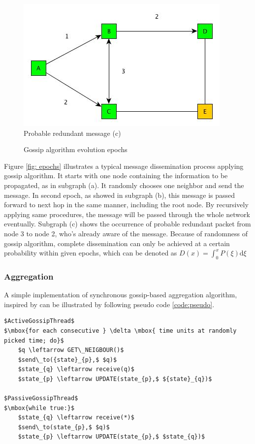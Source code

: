 \begin{figure}[!h]
\begin{center}
\begin{minipage}[c]{0.45\textwidth}
      \vspace{0pt}
      \includegraphics[width=\linewidth]{figures/network_gossip_3.jpg}
      Probable redundant message (c)
   	\end{minipage}
   \end{center}
   \caption{Gossip algorithm evolution epochs}
   \label{fig:epochs}
\end{figure}

Figure \ref{fig: epochs} illustrates a typical message dissemination process applying gossip algorithm. It starts with one node containing the information to be propagated, as in subgraph (a). It randomly chooses one neighbor and send the message. In second epoch, as showed in subgraph (b), this message is passed forward to next hop in the same manner, including the root node. By recursively applying same procedures, the message will be passed through the whole network eventually. Subgraph (c) shows the occurrence of probable redundant packet from node 3 to node 2, who's already aware of the message. Because of randomness of gossip algorithm, complete dissemination can only be achieved at a certain probability within given epochs, which can be denoted as $D(x)=\int_0^x P(\xi)\mathrm{d}\xi$\\

\subsubsection{Aggregation}

A simple implementation of synchronous gossip-based aggregation algorithm, inspired by \cite{jelasity_gossip-based_2005} can be illustrated by following pseudo code \ref{code:pseudo}.
\begin{lstlisting}[caption={Pseudo Code for gossip-based aggregation}, label=code:pseudo, mathescape=true]
$ActiveGossipThread$
$\mbox{for each consecutive } \delta \mbox{ time units at randomly picked time; do}$
    $q \leftarrow GET\_NEIGBOUR()$
    $send\_to({state}_{p},$ $q)$
    $state_{q} \leftarrow receive(q)$
    $state_{p} \leftarrow UPDATE(state_{p},$ ${state}_{q})$

$PassiveGossipThread$
$\mbox{while true:}$
    $state_{q} \leftarrow receive(*)$
    $send\_to(state_{p},$ $q)$
    $state_{p} \leftarrow UPDATE(state_{p},$ $state_{q})$
\end{lstlisting}

